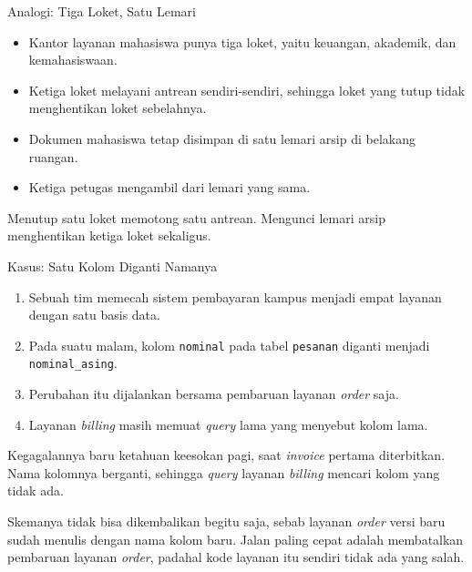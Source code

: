 \documentclass[aspectratio=169, table, 12pt]{beamer}
\begin{document}
\begin{frame}{{\Large Analogi: Tiga Loket, Satu Lemari}}
  \vspace{10pt}
  \begin{itemize}\small
    \item Kantor layanan mahasiswa punya tiga loket, yaitu keuangan,
          akademik, dan kemahasiswaan.
    \item Ketiga loket melayani antrean sendiri-sendiri, sehingga loket yang
          tutup tidak menghentikan loket sebelahnya.
    \item Dokumen mahasiswa tetap disimpan di satu lemari arsip di belakang
          ruangan.
    \item Ketiga petugas mengambil dari lemari yang sama.
  \end{itemize}

  \vspace{10pt}
  {\small Menutup satu loket memotong satu antrean. Mengunci lemari arsip
  menghentikan ketiga loket sekaligus.}
\end{frame}

\begin{frame}{{\Large Kasus: Satu Kolom Diganti Namanya}}
  \vspace{8pt}
  \begin{enumerate}\small
    \item Sebuah tim memecah sistem pembayaran kampus menjadi empat layanan
          dengan satu basis data.
    \item Pada suatu malam, kolom \texttt{nominal} pada tabel \texttt{pesanan} diganti
          menjadi \texttt{nominal\_asing}.
    \item Perubahan itu dijalankan bersama pembaruan layanan \textit{order} saja.
    \item Layanan \textit{billing} masih memuat \textit{query} lama yang menyebut kolom lama.
  \end{enumerate}

  \vspace{3pt}
  {\small Kegagalannya baru ketahuan keesokan pagi, saat \textit{invoice} pertama
  diterbitkan. Nama kolomnya berganti, sehingga \textit{query} layanan
  \textit{billing} mencari kolom yang tidak ada.}

  \vspace{3pt}
  {\small Skemanya tidak bisa dikembalikan begitu saja, sebab layanan \textit{order}
  versi baru sudah menulis dengan nama kolom baru. Jalan paling cepat adalah
  membatalkan pembaruan layanan \textit{order}, padahal kode layanan itu sendiri tidak
  ada yang salah.}
\end{frame}
\end{document}
